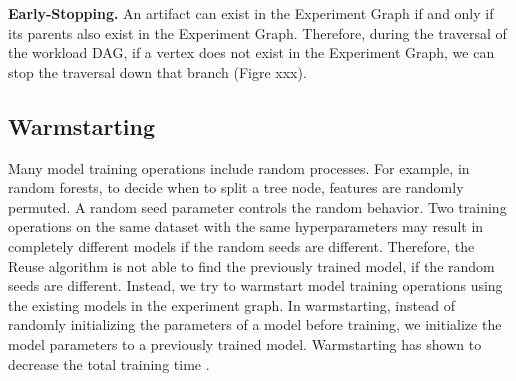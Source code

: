 \textbf{Early-Stopping.} 
An artifact can exist in the Experiment Graph if and only if its parents also exist in the Experiment Graph.
Therefore, during the traversal of the workload DAG, if a vertex does not exist in the Experiment Graph, we can stop the traversal down that branch (Figre xxx). 
\subsection{Warmstarting}
Many model training operations include random processes.
For example, in random forests, to decide when to split a tree node, features are randomly permuted.
A random seed parameter controls the random behavior.
Two training operations on the same dataset with the same hyperparameters may result in completely different models if the random seeds are different.
Therefore, the Reuse algorithm is not able to find the previously trained model, if the random seeds are different.
Instead, we try to warmstart model training operations using the existing models in the experiment graph.
In warmstarting, instead of randomly initializing the parameters of a model before training, we initialize the model parameters to a previously trained model.
Warmstarting has shown to decrease the total training time \cite{baylor2017tfx}.


